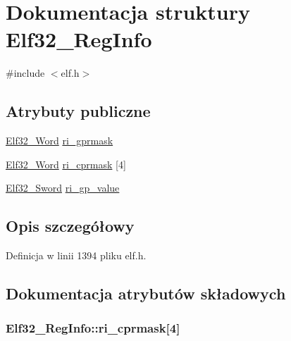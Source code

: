 \hypertarget{struct_elf32___reg_info}{\section{Dokumentacja struktury Elf32\-\_\-\-Reg\-Info}
\label{struct_elf32___reg_info}
}


{\ttfamily \#include $<$elf.\-h$>$}

\subsection*{Atrybuty publiczne}
\begin{DoxyCompactItemize}
\item 
\hyperlink{elf_8h_af5924ece606c732e86f8263a19408e45}{Elf32\-\_\-\-Word} \hyperlink{struct_elf32___reg_info_a14e7256134e34950e4fb5681d77dd353}{ri\-\_\-gprmask}
\item 
\hyperlink{elf_8h_af5924ece606c732e86f8263a19408e45}{Elf32\-\_\-\-Word} \hyperlink{struct_elf32___reg_info_a42ab40af79e7bbfb3122546aa99824a8}{ri\-\_\-cprmask} \mbox{[}4\mbox{]}
\item 
\hyperlink{elf_8h_a30ce6352cf03c667272698ada477da95}{Elf32\-\_\-\-Sword} \hyperlink{struct_elf32___reg_info_ae464ec715b979270bedadc8889f94a16}{ri\-\_\-gp\-\_\-value}
\end{DoxyCompactItemize}


\subsection{Opis szczegółowy}


Definicja w linii 1394 pliku elf.\-h.



\subsection{Dokumentacja atrybutów składowych}
\hypertarget{struct_elf32___reg_info_a42ab40af79e7bbfb3122546aa99824a8}{
\subsubsection[{ri\-\_\-cprmask}]{ Elf32\-\_\-\-Reg\-Info\-::ri\-\_\-cprmask\mbox{[}4\mbox{]}}}\label{struct_elf32___reg_info_a42ab40af79e7bbfb3122546aa99824a8}


